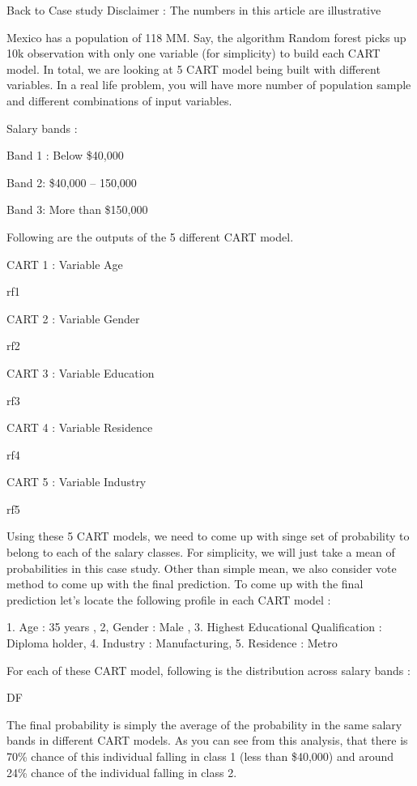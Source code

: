 \documentclass[a4paper,12pt]{article}
\begin{document}
Back to Case  study
Disclaimer : The numbers in this article are illustrative

Mexico has a population of 118 MM. Say, the algorithm Random forest picks up 10k observation with only one variable (for simplicity) to build each CART model. In total, we are looking at 5 CART model being built with different variables. In a real life problem, you will have more number of population sample and different combinations of  input variables.

Salary bands :

Band 1 : Below \$40,000

Band 2: \$40,000 – 150,000

Band 3: More than \$150,000

Following are the outputs of the 5 different CART model.

CART 1 : Variable Age

rf1

CART 2 : Variable Gender

rf2

CART 3 : Variable Education

rf3

CART 4 : Variable Residence

rf4

CART 5 : Variable Industry

rf5

Using these 5 CART models, we need to come up with singe set of probability to belong to each of the salary classes. For simplicity, we will just take a mean of probabilities in this case study. Other than simple mean, we also consider vote method to come up with the final prediction. To come up with the final prediction let’s locate the following profile in each CART model :

1. Age : 35 years , 2, Gender : Male , 3. Highest Educational Qualification : Diploma holder, 4. Industry : Manufacturing, 5. Residence : Metro

For each of these CART model, following is the distribution across salary bands :

DF

The final probability is simply the average of the probability in the same salary bands in different CART models. As you can see from this analysis, that there is 70\% chance of this individual falling in class 1 (less than \$40,000) and around 24\% chance of the individual falling in class 2.
\end{document}
